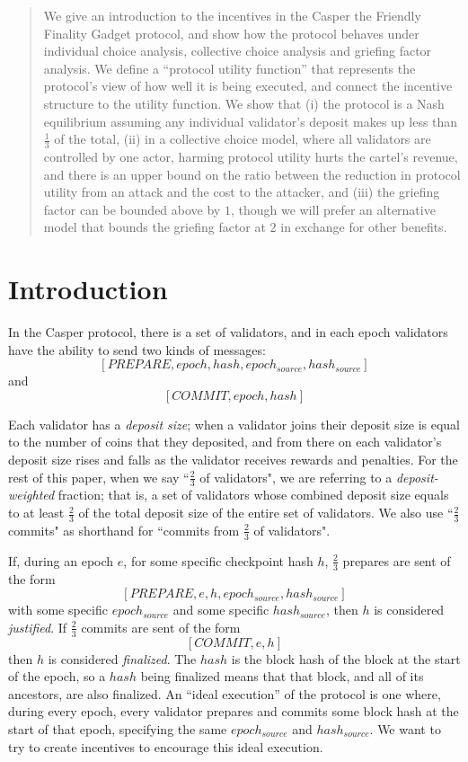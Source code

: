 \documentclass[12pt]{article}
\begin{document}
\maketitle
\begin{abstract}
We give an introduction to the incentives in the Casper the Friendly Finality Gadget protocol, and show how the protocol behaves under individual choice analysis, collective choice analysis and griefing factor analysis. We define a ``protocol utility function'' that represents the protocol's view of how well it is being executed, and connect the incentive structure to the utility function. We show that (i) the protocol is a Nash equilibrium assuming any individual validator's deposit makes up less than $\frac{1}{3}$ of the total, (ii) in a collective choice model, where all validators are controlled by one actor, harming protocol utility hurts the cartel's revenue, and there is an upper bound on the ratio between the reduction in protocol utility from an attack and the cost to the attacker, and (iii) the griefing factor can be bounded above by $1$, though we will prefer an alternative model that bounds the griefing factor at $2$ in exchange for other benefits.
\end{abstract}

\section{Introduction}
In the Casper protocol, there is a set of validators, and in each epoch validators have the ability to send two kinds of messages: $$[PREPARE, epoch, hash, epoch_{source}, hash_{source}]$$ and $$[COMMIT, epoch, hash]$$

Each validator has a \textit{deposit size}; when a validator joins their deposit size is equal to the number of coins that they deposited, and from there on each validator's deposit size rises and falls as the validator receives rewards and penalties. For the rest of this paper, when we say ``$\frac{2}{3}$ of validators", we are referring to a \textit{deposit-weighted} fraction; that is, a set of validators whose combined deposit size equals to at least $\frac{2}{3}$ of the total deposit size of the entire set of validators. We also use ``$\frac{2}{3}$ commits" as shorthand for ``commits from $\frac{2}{3}$ of validators".

If, during an epoch $e$, for some specific checkpoint hash $h$, $\frac{2}{3}$ prepares are sent of the form $$[PREPARE, e, h, epoch_{source}, hash_{source}]$$ with some specific $epoch_{source}$ and some specific $hash_{source}$, then $h$ is considered \textit{justified}. If $\frac{2}{3}$ commits are sent of the form $$[COMMIT, e, h]$$ then $h$ is considered \textit{finalized}. The $hash$ is the block hash of the block at the start of the epoch, so a $hash$ being finalized means that that block, and all of its ancestors, are also finalized. An ``ideal execution'' of the protocol is one where, during every epoch, every validator prepares and commits some block hash at the start of that epoch, specifying the same $epoch_{source}$ and $hash_{source}$. We want to try to create incentives to encourage this ideal execution.
\end{document}
